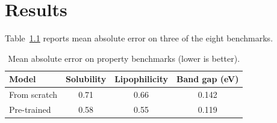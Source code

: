 \chapter{Results}
\label{ch:results}

Table~\ref{tab:mae} reports mean absolute error on three of the eight benchmarks.

\begin{table}[htbp]
  \centering
  \caption{Mean absolute error on property benchmarks (lower is better).}
  \label{tab:mae}
  \begin{tabular}{lccc}
    \toprule
    Model & Solubility & Lipophilicity & Band gap (eV) \\
    \midrule
    From scratch     & 0.71 & 0.66 & 0.142 \\
    Pre-trained      & 0.58 & 0.55 & 0.119 \\
    \bottomrule
  \end{tabular}
\end{table}
